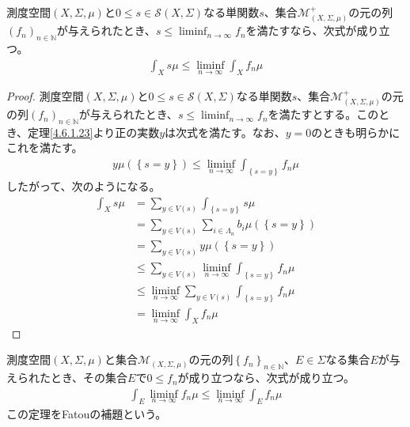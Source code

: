 \documentclass[dvipdfmx]{jsarticle}
\begin{document}
\begin{thm}\label{4.6.1.24}
測度空間$(X,\varSigma,\mu)$と$0 \leq s \in \mathcal{S}(X,\varSigma)$なる単関数$s$、集合$\mathcal{M}_{(X,\varSigma,\mu)}^{+}$の元の列$\left( f_{n} \right)_{n \in \mathbb{N}}$が与えられたとき、$s \leq \liminf_{n \rightarrow \infty}f_{n}$を満たすなら、次式が成り立つ。
\begin{align*}
\int_{X} {s\mu} \leq \liminf_{n \rightarrow \infty}{\int_{X} {f_{n}\mu}}
\end{align*}
\end{thm}
\begin{proof}
測度空間$(X,\varSigma,\mu)$と$0 \leq s \in \mathcal{S}(X,\varSigma)$なる単関数$s$、集合$\mathcal{M}_{(X,\varSigma,\mu)}^{+}$の元の列$\left( f_{n} \right)_{n \in \mathbb{N}}$が与えられたとき、$s \leq \liminf_{n \rightarrow \infty}f_{n}$を満たすとする。このとき、定理\ref{4.6.1.23}より正の実数$y$は次式を満たす。なお、$y = 0$のときも明らかにこれを満たす。
\begin{align*}
y\mu\left( \left\{ s = y \right\} \right) \leq \liminf_{n \rightarrow \infty}{\int_{\left\{ s = y \right\}} {f_{n}\mu}}
\end{align*}
したがって、次のようになる。
\begin{align*}
\int_{X} {s\mu} &= \sum_{y \in V(s)} {\int_{\left\{ s = y \right\}} {s\mu}}\\
&= \sum_{y \in V(s)} {\sum_{i \in \varLambda_{n}} {b_{i}\mu\left( \left\{ s = y \right\} \right)}}\\
&= \sum_{y \in V(s)} {y\mu\left( \left\{ s = y \right\} \right)}\\
&\leq \sum_{y \in V(s)} {\liminf_{n \rightarrow \infty}{\int_{\left\{ s = y \right\}} {f_{n}\mu}}}\\
&\leq \liminf_{n \rightarrow \infty}{\sum_{y \in V(s)} {\int_{\left\{ s = y \right\}} {f_{n}\mu}}}\\
&= \liminf_{n \rightarrow \infty}{\int_{X} {f_{n}\mu}}
\end{align*}
\end{proof}
\begin{thm}[Fatouの補題]\label{4.6.1.25}
測度空間$(X,\varSigma,\mu)$と集合$\mathcal{M}_{(X,\varSigma,\mu)}$の元の列$\left\{ f_{n} \right\}_{n \in \mathbb{N}}$、$E \in \varSigma$なる集合$E$が与えられたとき、その集合$E$で$0 \leq f_{n}$が成り立つなら、次式が成り立つ。
\begin{align*}
\int_{E} {\liminf_{n \rightarrow \infty}f_{n}\mu} \leq \liminf_{n \rightarrow \infty}{\int_{E} {f_{n}\mu}}
\end{align*}
この定理をFatouの補題という。
\end{thm}
\end{document}
